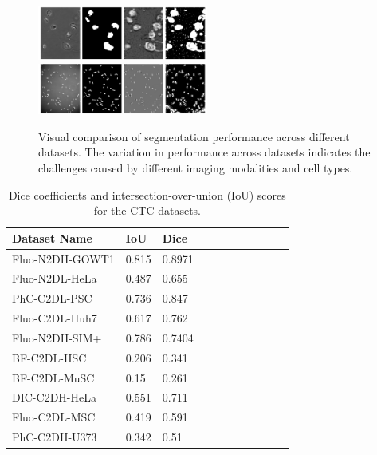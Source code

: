 \documentclass[./dissertation.tex]{subfiles}
\begin{document}
\begin{figure}
    \includegraphics[width=0.5\textwidth]{./figures/cc/PhC-C2DH-U373.png}
    \includegraphics[width=0.5\textwidth]{./figures/cc/PhC-C2DL-PSC.png}
    \caption{Visual comparison of segmentation performance across different datasets. The variation in performance across datasets indicates the challenges caused by different imaging modalities and cell types.} \label{fig2}
\end{figure}


\begin{table}[ht]
    \caption{Dice coefficients and intersection-over-union (IoU) scores for the CTC datasets.}
    \label{tbl:iou_dice}
    \centering
    \begin{tabular}{|l|l|l|l|l|l|l|l|l|l|l|}
        \hline
        \textbf{Dataset Name} & \textbf{IoU} & \textbf{Dice} \\ \hline
        Fluo-N2DH-GOWT1       & 0.815        & 0.8971        \\ \hline
        Fluo-N2DL-HeLa        & 0.487        & 0.655         \\ \hline
        PhC-C2DL-PSC          & 0.736        & 0.847         \\ \hline
        Fluo-C2DL-Huh7        & 0.617        & 0.762         \\ \hline
        Fluo-N2DH-SIM+        & 0.786        & 0.7404        \\ \hline
        BF-C2DL-HSC           & 0.206        & 0.341         \\ \hline
        BF-C2DL-MuSC          & 0.15         & 0.261         \\ \hline
        DIC-C2DH-HeLa         & 0.551        & 0.711         \\ \hline
        Fluo-C2DL-MSC         & 0.419        & 0.591         \\ \hline
        PhC-C2DH-U373         & 0.342        & 0.51          \\ \hline
    \end{tabular}
\end{table}
\end{document}
